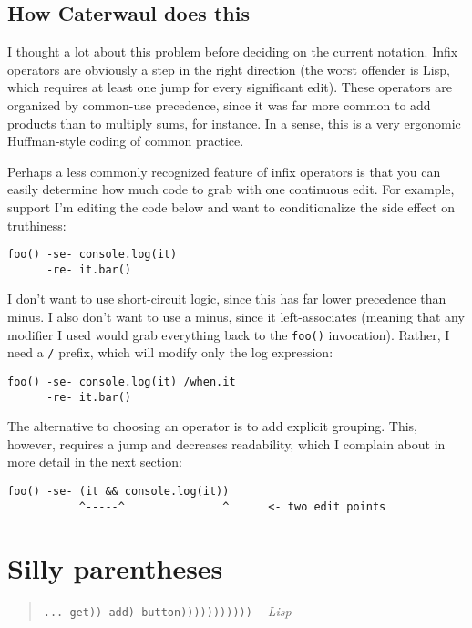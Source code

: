 \documentclass{report}
\begin{document}
\subsection{How Caterwaul does this}
      I thought a lot about this problem before deciding on the current notation. Infix operators are obviously a step in the right direction (the worst offender is Lisp, which requires at
      least one jump for every significant edit). These operators are organized by common-use precedence, since it was far more common to add products than to multiply sums, for instance. In a
      sense, this is a very ergonomic Huffman-style coding of common practice.

      Perhaps a less commonly recognized feature of infix operators is that you can easily determine how much code to grab with one continuous edit. For example, support I'm editing the code
      below and want to conditionalize the side effect on truthiness:

\begin{verbatim}
foo() -se- console.log(it)
      -re- it.bar()
\end{verbatim}

      I don't want to use short-circuit logic, since this has far lower precedence than minus. I also don't want to use a minus, since it left-associates (meaning that any modifier I used
      would grab everything back to the {\tt foo()} invocation). Rather, I need a {\tt /} prefix, which will modify only the log expression:

\begin{verbatim}
foo() -se- console.log(it) /when.it
      -re- it.bar()
\end{verbatim}

      The alternative to choosing an operator is to add explicit grouping. This, however, requires a jump and decreases readability, which I complain about in more detail in the next section:

\begin{verbatim}
foo() -se- (it && console.log(it))
           ^-----^               ^      <- two edit points
\end{verbatim}

\section{Silly parentheses}
\begin{quote}
{\tt ... get)) add) button)))))))))))}
\hfill \textit{-- Lisp}
\end{quote}
\end{document}

